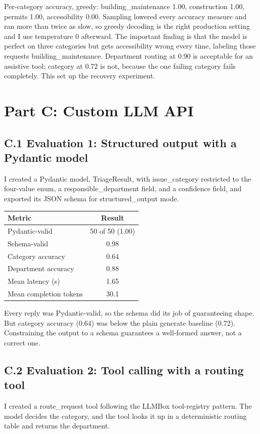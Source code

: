 \documentclass[11pt]{article}
\begin{document}
Per-category accuracy, greedy: building\_maintenance 1.00, construction 1.00, permits 1.00, accessibility 0.00. Sampling lowered every accuracy measure and ran more than twice as slow, so greedy decoding is the right production setting and I use temperature 0 afterward. The important finding is that the model is perfect on three categories but gets accessibility wrong every time, labeling those requests building\_maintenance. Department routing at 0.90 is acceptable for an assistive tool; category at 0.72 is not, because the one failing category fails completely. This set up the recovery experiment.

\section{Part C: Custom LLM API}

\subsection*{C.1 Evaluation 1: Structured output with a Pydantic model}
I created a Pydantic model, TriageResult, with issue\_category restricted to the four-value enum, a responsible\_department field, and a confidence field, and exported its JSON schema for structured\_output mode.

\begin{center}
\small
\begin{tabularx}{\textwidth}{X c}
\toprule
\textbf{Metric} & \textbf{Result} \\
\midrule
Pydantic-valid & 50 of 50 (1.00) \\
Schema-valid & 0.98 \\
Category accuracy & 0.64 \\
Department accuracy & 0.88 \\
Mean latency (s) & 1.65 \\
Mean completion tokens & 30.1 \\
\bottomrule
\end{tabularx}
\end{center}

Every reply was Pydantic-valid, so the schema did its job of guaranteeing shape. But category accuracy (0.64) was below the plain generate baseline (0.72). Constraining the output to a schema guarantees a well-formed answer, not a correct one.

\subsection*{C.2 Evaluation 2: Tool calling with a routing tool}
I created a route\_request tool following the LLMBox tool-registry pattern. The model decides the category, and the tool looks it up in a deterministic routing table and returns the department.
\end{document}
